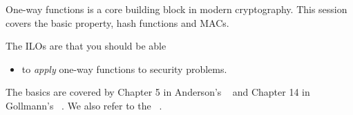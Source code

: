 One-way functions is a core building block in modern cryptography.
This session covers the basic property, hash functions and \acp{MAC}.

The \acp{ILO} are that you should be able
\begin{itemize}
  \item to \emph{apply} one-way functions to security problems.
\end{itemize}

The basics are covered by
Chapter 5 in Anderson's ~\cite{Anderson2008sea} and
Chapter 14 in Gollmann's ~\cite{Gollmann2011cs}.
We also refer to the ~\cite{EOCS}.
